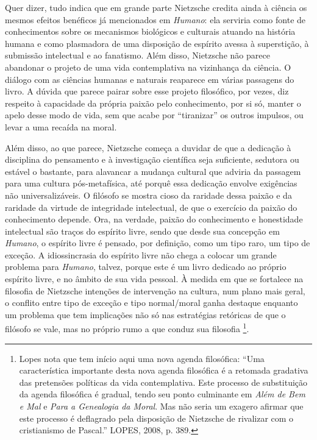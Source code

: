 \documentclass[
	12pt,				%
	openright,			%
	oneside,			%
	a4paper,			%
	english,			%
	french,				%
	spanish,			%
	brazil				%
	]{abntex2}
\begin{document}
	Quer dizer, tudo indica que em grande parte Nietzsche credita ainda à ciência os mesmos efeitos benéficos já mencionados em \textit{Humano}: ela serviria como fonte de conhecimentos sobre os mecanismos biológicos e culturais atuando na história humana e como plasmadora de uma disposição de espírito avessa à superstição, à submissão intelectual e ao fanatismo. Além disso, Nietzsche não parece abandonar o projeto de uma vida contemplativa na vizinhança da ciência. O diálogo com as ciências humanas e naturais reaparece em várias passagens do livro. A dúvida que parece pairar sobre esse projeto filosófico, por vezes, diz respeito à capacidade da própria paixão pelo conhecimento, por si só, manter o apelo desse modo de vida, sem que acabe por “tiranizar” os outros impulsos, ou levar a uma recaída na moral.
	
	Além disso, ao que parece, Nietzsche começa a duvidar de que a dedicação à disciplina do pensamento e à investigação científica seja suficiente, sedutora ou estável o bastante, para alavancar a mudança cultural que adviria da passagem para uma cultura pós-metafísica, até porquê essa dedicação envolve exigências não universalizáveis. O filósofo se mostra cioso da raridade dessa paixão e da raridade da virtude de integridade intelectual, de que o exercício da paixão do conhecimento depende. Ora, na verdade, paixão do conhecimento e honestidade intelectual são traços do espírito livre, sendo que desde sua concepção em \textit{Humano}, o espírito livre é pensado, por definição, como um tipo raro, um tipo de exceção. A idiossincrasia do espírito livre não chega a colocar um grande problema para \textit{Humano}, talvez, porque este é um livro dedicado ao próprio espírito livre, e no âmbito de sua vida pessoal. À medida em que se fortalece na filosofia de Nietzsche intenções de intervenção na cultura, num plano mais geral, o conflito entre tipo de exceção e tipo normal/moral ganha destaque enquanto um problema que tem implicações não só nas estratégias retóricas de que o filósofo se vale, mas no próprio rumo a que conduz sua filosofia
\footnote{Lopes nota que tem início aqui uma nova agenda filosófica: “Uma característica importante desta nova agenda filosófica é a retomada gradativa das pretensões políticas da vida contemplativa. Este processo de substituição da agenda filosófica é gradual, tendo seu ponto culminante em \textit{Além de Bem e Mal} e \textit{Para a Genealogia da Moral}. Mas não seria um exagero afirmar que este processo é deflagrado pela disposição de Nietzsche de rivalizar com o cristianismo de Pascal.” LOPES, 2008, p. 389.}.
\end{document}
